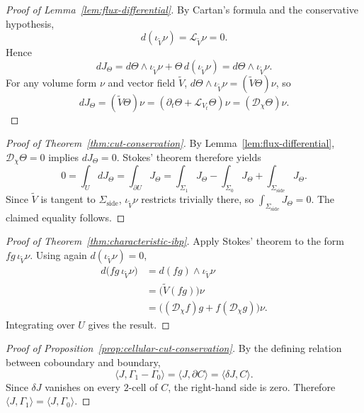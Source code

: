 \begin{proof}[Proof of Lemma~\ref{lem:flux-differential}]
\label{proof:lem:flux-differential}
By Cartan's formula and the conservative hypothesis,
\[
d(\iota_{\widetilde V}\nu)=\mathcal L_{\widetilde V}\nu=0.
\]
Hence
\[
dJ_\Theta
= d\Theta \wedge \iota_{\widetilde V}\nu
  + \Theta\, d(\iota_{\widetilde V}\nu)
= d\Theta \wedge \iota_{\widetilde V}\nu.
\]
For any volume form $\nu$ and vector field $\widetilde V$,
$d\Theta \wedge \iota_{\widetilde V}\nu = (\widetilde V\Theta)\nu$, so
\[
dJ_\Theta = (\widetilde V\Theta)\nu
          = (\partial_t\Theta + \mathcal L_{V_t}\Theta)\nu
          = (\mathcal D_\chi \Theta)\nu.
\]
\end{proof}

\begin{proof}[Proof of Theorem~\ref{thm:cut-conservation}]
\label{proof:thm:cut-conservation}
By Lemma~\ref{lem:flux-differential}, $\mathcal D_\chi \Theta = 0$ implies
$dJ_\Theta=0$. Stokes' theorem therefore yields
\[
0 = \int_U dJ_\Theta = \int_{\partial U} J_\Theta
  = \int_{\Sigma_1} J_\Theta - \int_{\Sigma_0} J_\Theta
    + \int_{\Sigma_{\mathrm{side}}} J_\Theta.
\]
Since $\widetilde V$ is tangent to $\Sigma_{\mathrm{side}}$,
$\iota_{\widetilde V}\nu$ restricts trivially there, so
$\int_{\Sigma_{\mathrm{side}}} J_\Theta=0$. The claimed equality follows.
\end{proof}

\begin{proof}[Proof of Theorem~\ref{thm:characteristic-ibp}]
\label{proof:thm:characteristic-ibp}
Apply Stokes' theorem to the form $fg\,\iota_{\widetilde V}\nu$. Using again
$d(\iota_{\widetilde V}\nu)=0$,
\begin{align*}
d\bigl(fg\,\iota_{\widetilde V}\nu\bigr)
&= d(fg)\wedge \iota_{\widetilde V}\nu \\
&= \bigl(\widetilde V(fg)\bigr)\nu \\
&= \bigl((\mathcal D_\chi f)g + f(\mathcal D_\chi g)\bigr)\nu.
\end{align*}
Integrating over $U$ gives the result.
\end{proof}

\begin{proof}[Proof of Proposition~\ref{prop:cellular-cut-conservation}]
\label{proof:prop:cellular-cut-conservation}
By the defining relation between coboundary and boundary,
\[
\langle J,\Gamma_1-\Gamma_0\rangle
=
\langle J,\partial C\rangle
=
\langle \delta J,C\rangle.
\]
Since $\delta J$ vanishes on every $2$-cell of $C$, the right-hand side is
zero. Therefore $\langle J,\Gamma_1\rangle = \langle J,\Gamma_0\rangle$.
\end{proof}

